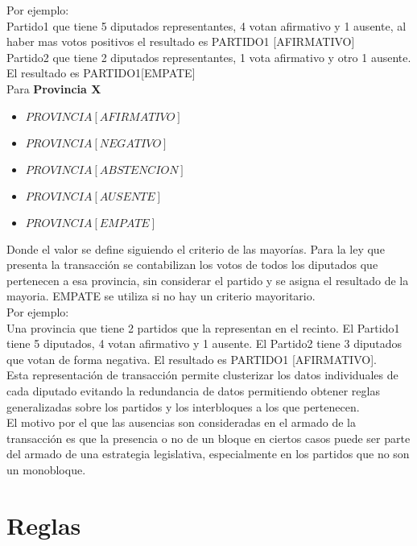 \documentclass{endm}
\begin{document}
Por ejemplo: \\

Partido1 que tiene 5 diputados representantes, 4 votan afirmativo y 1 ausente, al haber mas votos positivos el resultado es PARTIDO1 [AFIRMATIVO] \\

Partido2 que tiene 2 diputados representantes, 1 vota afirmativo y otro 1 ausente. El resultado es PARTIDO1[EMPATE] \\

Para \textbf{Provincia X} \\

\begin{itemize}
\item $PROVINCIA [AFIRMATIVO]$
\item $PROVINCIA [NEGATIVO]$
\item $PROVINCIA [ABSTENCION]$
\item $PROVINCIA [AUSENTE]$ 
\item $PROVINCIA [EMPATE]$ \\
\end{itemize}

Donde el valor se define siguiendo el criterio de las mayorías. Para la ley que presenta la transacción se contabilizan los votos de todos los diputados que pertenecen a esa provincia, sin considerar el partido y se asigna el resultado de la mayoria. EMPATE se utiliza si no hay un criterio mayoritario. \\

Por ejemplo: \\

Una provincia que tiene 2 partidos que la representan en el recinto. El Partido1 tiene 5 diputados, 4 votan afirmativo y 1 ausente. El Partido2 tiene 3 diputados que votan de forma negativa. El resultado es PARTIDO1 [AFIRMATIVO]. \\

Esta representación de transacción permite clusterizar los datos individuales de cada diputado evitando la redundancia de datos permitiendo obtener reglas generalizadas sobre los partidos y los interbloques a los que pertenecen. \\

El motivo por el que las ausencias son consideradas en el armado de la transacción es que la presencia o no de un bloque en ciertos casos puede ser parte del armado de una estrategia legislativa, especialmente en los partidos que no son un monobloque.

\section{Reglas}\label{desarrollo}
\end{document}
